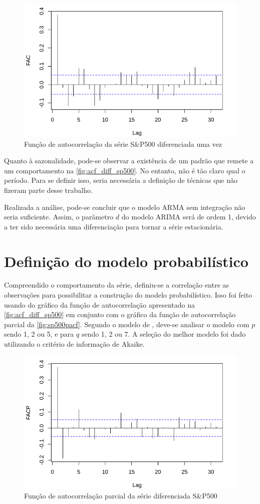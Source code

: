 \documentclass[
    12pt,
    oneside,
    a4paper,
    english,
    brazil
]{abntex2}
\begin{document}
\begin{figure}[ht]
    \centering
    \caption{Função de autocorrelação da série S\&P500 diferenciada uma vez}\label{fig:acf_diff_sp500}
    \includegraphics[width=.5\linewidth]{images/SP500_diff_FAC.png}
\end{figure}

Quanto à sazonalidade, pode-se observar a  existência de um padrão que remete a
um comportamento na  \autoref{fig:acf_diff_sp500}. No entanto, não  é tão claro
qual o período.  Para se definir isso, seria necessária  a definição de técnicas
que não fizeram parte desse trabalho.

Realizada  a  análise,  pode-se concluir  que  o  modelo  ARMA  sem
integração não seria suficiente. Assim, o  parâmetro $d$ do modelo ARIMA será de
ordem 1,  devido a ter  sido necessária uma  diferenciação para tornar  a série
estacionária.

\section{Definição do modelo probabilístico}

Compreendido  o  comportamento  da  série, definiu-se  a  correlação  entre  as
observações para possibilitar a construção  do modelo probabilístico. Isso foi feito usando do
gráfico da função de autocorrelação apresentado na \autoref{fig:acf_diff_sp500}
em   conjunto  com   o  gráfico   da  função   de  autocorrelação   parcial  da
\autoref{fig:sp500pacf}. Segundo o modelo de , deve-se analisar
o modelo com $p$  sendo 1, 2 ou 5, e para $q$ sendo 1, 2 ou 7. A seleção do
melhor modelo foi dado utilizando o critério de informação de Akaike.

\begin{figure}[ht]
    \centering
    \caption{Função de autocorrelação parcial da série diferenciada S\&P500}\label{fig:sp500pacf}
    \includegraphics[width=.5\linewidth]{images/SP500_diff_FACP.png}
\end{figure}
\end{document}

